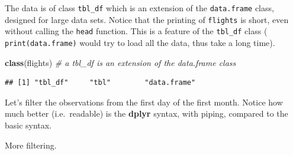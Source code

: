 \documentclass[]{book}
\newenvironment{Shaded}{\begin{snugshade}}{\end{snugshade}}
\newcommand{\CommentTok}[1]{\textcolor[rgb]{0.56,0.35,0.01}{\textit{#1}}}
\newcommand{\DecValTok}[1]{\textcolor[rgb]{0.00,0.00,0.81}{#1}}
\newcommand{\KeywordTok}[1]{\textcolor[rgb]{0.13,0.29,0.53}{\textbf{#1}}}
\newcommand{\NormalTok}[1]{#1}
\newcommand{\OperatorTok}[1]{\textcolor[rgb]{0.81,0.36,0.00}{\textbf{#1}}}
\newcommand{\StringTok}[1]{\textcolor[rgb]{0.31,0.60,0.02}{#1}}
\theoremstyle{definition}
\theoremstyle{definition}
\theoremstyle{definition}
\theoremstyle{remark}
\begin{document}
The data is of class \texttt{tbl\_df} which is an extension of the \texttt{data.frame} class, designed for large data sets.
Notice that the printing of \texttt{flights} is short, even without calling the \texttt{head} function. This is a feature of the \texttt{tbl\_df} class ( \texttt{print(data.frame)} would try to load all the data, thus take a long time).

\begin{Shaded}
\begin{Highlighting}[]
\KeywordTok{class}\NormalTok{(flights) }\CommentTok{# a tbl_df is an extension of the data.frame class}
\end{Highlighting}
\end{Shaded}

\begin{verbatim}
## [1] "tbl_df"     "tbl"        "data.frame"
\end{verbatim}

Let's filter the observations from the first day of the first month.
Notice how much better (i.e.~readable) is the \textbf{dplyr} syntax, with piping, compared to the basic syntax.

\begin{Shaded}
\end{Shaded}

More filtering.
\end{document}
